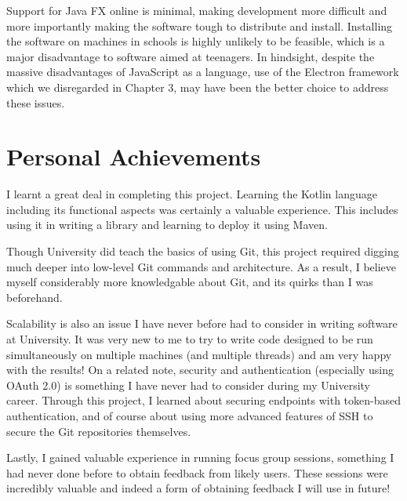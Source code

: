 Support for Java FX online is minimal, making development more difficult and more importantly making the software tough to distribute and install. Installing the software on machines in schools is highly unlikely to be feasible, which is a major disadvantage to software aimed at teenagers. In hindsight, despite the massive disadvantages of JavaScript as a language, use of the Electron framework which we disregarded in Chapter 3, may have been the better choice to address these issues.

\section{Personal Achievements}

I learnt a great deal in completing this project. Learning the Kotlin language including its functional aspects was certainly a valuable experience. This includes using it in writing a library and learning to deploy it using Maven.

Though University did teach the basics of using Git, this project required digging much deeper into low-level Git commands and architecture. As a result, I believe myself considerably more knowledgable about Git, and its quirks than I was beforehand. 

Scalability is also an issue I have never before had to consider in writing software at University. It was very new to me to try to write code designed to be run simultaneously on multiple machines (and multiple threads) and am very happy with the results! On a related note, security and authentication (especially using OAuth 2.0) is something I have never had to consider during my University career. Through this project, I learned about securing endpoints with token-based authentication, and of course about using more advanced features of SSH to secure the Git repositories themselves.

Lastly, I gained valuable experience in running focus group sessions, something I had never done before to obtain feedback from likely users. These sessions were incredibly valuable and indeed a form of obtaining feedback I will use in future!